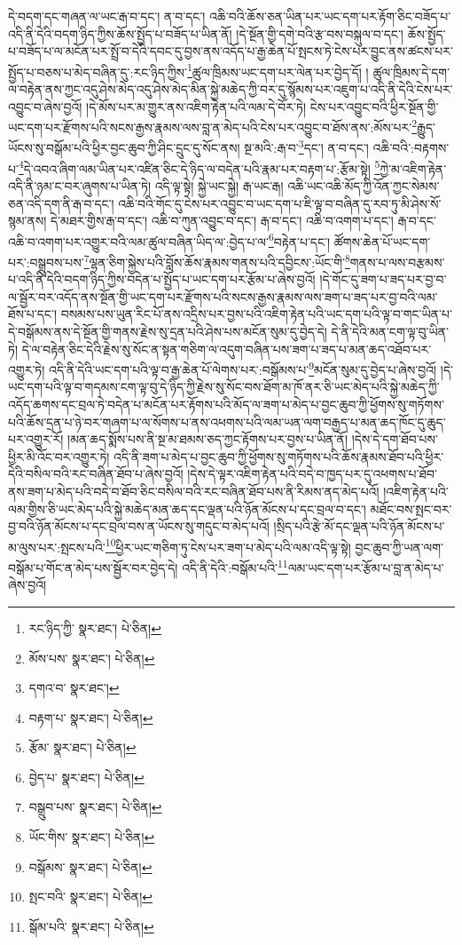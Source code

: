 དེ་བདག་དང་གཞན་ལ་ཡང་རྒ་བ་དང་། ན་བ་དང་། འཆི་བའི་ཆོས་ཅན་ཡིན་པར་ཡང་དག་པར་རྟོག་ཅིང་བཟོད་པ་འདི་ནི་དེའི་བདག་ཉིད་ཀྱིས་ཆོས་སྤྱོད་པ་བཟོད་པ་ཡིན་ནོ། །དེ་སྔོན་གྱི་དགེ་བའི་རྩ་བས་བསྐུལ་བ་དང་། ཆོས་སྤྱོད་པ་བཟོད་པ་ལ་མངོན་པར་སྤྲོ་བ་དེའི་དབང་དུ་བྱས་ནས་འདོད་པ་རྒྱ་ཆེན་པོ་སྤངས་ཏེ་ངེས་པར་བྱུང་ནས་ཚངས་པར་སྤྱོད་པ་བཅས་པ་མེད་བཞིན་དུ་:རང་ཉིད་ཀྱིས་\footnote{རང་ཉིད་ཀྱི་  སྣར་ཐང་།  པེ་ཅིན། }ཚུལ་ཁྲིམས་ཡང་དག་པར་ལེན་པར་བྱེད་དོ། །
ཚུལ་ཁྲིམས་དེ་དག་ལ་བརྟེན་ནས་ཀྱང་འདུ་ཤེས་མེད་འདུ་ཤེས་མེད་མིན་སྐྱེ་མཆེད་ཀྱི་བར་དུ་སྙོམས་པར་འཇུག་པ་འདི་ནི་དེའི་ངེས་པར་འབྱུང་བ་ཞེས་བྱའོ། །དེ་མོས་པར་མ་གྱུར་ནས་འཇིག་རྟེན་པའི་ལམ་དེ་བོར་ཏེ། ངེས་པར་འབྱུང་བའི་ཕྱིར་སྔོན་གྱི་ཡང་དག་པར་རྫོགས་པའི་སངས་རྒྱས་རྣམས་ལས་བླ་ན་མེད་པའི་ངེས་པར་འབྱུང་བ་ཐོས་ནས་:མོས་པར་\footnote{མོས་པས་  སྣར་ཐང་།  པེ་ཅིན། }རྒྱུད་ཡོངས་སུ་བསྒོམ་པའི་ཕྱིར་བྱང་ཆུབ་ཀྱི་ཤིང་དྲུང་དུ་སོང་ནས། སྔ་མའི་:རྒ་བ་\footnote{དགའ་བ་  སྣར་ཐང་། }དང་། ན་བ་དང་། འཆི་བའི་:བརྟགས་པ་\footnote{བརྟག་པ་  སྣར་ཐང་།  པེ་ཅིན། }དེ་འབའ་ཞིག་ལམ་ཡིན་པར་འཛིན་ཅིང་དེ་ཉིད་ལ་བདེན་པའི་རྣམ་པར་བརྟག་པ་:རྩོམ་སྟེ། \footnote{རྩོམ་  སྣར་ཐང་།  པེ་ཅིན། }ཀྱེ་མ་འཇིག་རྟེན་འདི་ནི་ཉམ་ང་བར་ཞུགས་པ་ཡིན་ཏེ། འདི་ལྟ་སྟེ། སྐྱེ་ཡང་སྐྱེ། རྒ་ཡང་རྒ། འཆི་ཡང་འཆི་མོད་ཀྱི་འོན་ཀྱང་སེམས་ཅན་འདི་དག་ནི་རྒ་བ་དང་། འཆི་བའི་གོང་དུ་ངེས་པར་འབྱུང་བ་ཡང་དག་པ་ཇི་ལྟ་བ་བཞིན་དུ་རབ་ཏུ་མི་ཤེས་སོ་སྙམ་ནས། དེ་མཐར་གྱིས་རྒ་བ་དང་། འཆི་བ་ཀུན་འབྱུང་བ་དང་། རྒ་བ་དང་། འཆི་བ་འགག་པ་དང་། རྒ་བ་དང་འཆི་བ་འགག་པར་འགྱུར་བའི་ལམ་ཚུལ་བཞིན་ཡིད་ལ་:བྱེད་པ་ལ་\footnote{བྱེད་པ་  སྣར་ཐང་།  པེ་ཅིན། }བརྟེན་པ་དང་། ཚོགས་ཆེན་པོ་ཡང་དག་པར་:བསྒྲུབས་པས་\footnote{བསྒྲུབ་པས་  སྣར་ཐང་།  པེ་ཅིན། }ལྷན་ཅིག་སྐྱེས་པའི་བློས་ཆོས་རྣམས་གནས་པའི་དབྱིངས་:ཡོང་གི་\footnote{ཡོང་གིས་  སྣར་ཐང་།  པེ་ཅིན། }གནས་པ་ལས་བརྩམས་པ་འདི་ནི་དེའི་བདག་ཉིད་ཀྱིས་བདེན་པ་སྤྱོད་པ་ཡང་དག་པར་རྩོམ་པ་ཞེས་བྱའོ། །དེ་གོང་དུ་ཟག་པ་ཟད་པར་བྱ་བ་ལ་སྦྱོར་བར་འདོད་ནས་སྔོན་གྱི་ཡང་དག་པར་རྫོགས་པའི་སངས་རྒྱས་རྣམས་ལས་ཟག་པ་ཟད་པར་བྱ་བའི་ལམ་ཐོས་པ་དང་། བསམས་པས་ཡུན་རིང་པོ་ནས་འདྲིས་པར་བྱས་པའི་འཇིག་རྟེན་པའི་ཡང་དག་པའི་ལྟ་བ་གང་ཡིན་པ་དེ་བསྒོམས་ནས་དེ་སྔོན་གྱི་གནས་རྗེས་སུ་དྲན་པའི་ཤེས་པས་མངོན་སུམ་དུ་བྱེད་དེ། དེ་ནི་དེའི་མན་ངག་ལྟ་བུ་ཡིན་ཏེ། དེ་ལ་བརྟེན་ཅིང་དེའི་རྗེས་སུ་སོང་ན་སྟན་གཅིག་ལ་འདུག་བཞིན་པས་ཟག་པ་ཟད་པ་མན་ཆད་འཐོབ་པར་འགྱུར་ཏེ། འདི་ནི་དེའི་ཡང་དག་པའི་ལྟ་བ་རྒྱ་ཆེན་པོ་ལེགས་པར་:བསྒོམས་པ་\footnote{བསྒོམས་  སྣར་ཐང་།  པེ་ཅིན། }མངོན་སུམ་དུ་བྱེད་པ་ཞེས་བྱའོ། །དེ་ཡང་དག་པའི་ལྟ་བ་གདམས་ངག་ལྟ་བུ་དེ་ཉིད་ཀྱི་རྗེས་སུ་སོང་བས་ཐོག་མ་ཁོ་ནར་ཅི་ཡང་མེད་པའི་སྐྱེ་མཆེད་ཀྱི་འདོད་ཆགས་དང་བྲལ་ཏེ་བདེན་པ་མངོན་པར་རྟོགས་པའི་མོད་ལ་ཟག་པ་མེད་པ་བྱང་ཆུབ་ཀྱི་ཕྱོགས་སུ་གཏོགས་པའི་ཆོས་དྲན་པ་ཉེ་བར་གཞག་པ་ལ་སོགས་པ་ནས་འཕགས་པའི་ལམ་ཡན་ལག་བརྒྱད་པ་མན་ཆད་ཁོང་དུ་ཆུད་པར་འགྱུར་རོ། །མན་ཆད་སྨོས་པས་ནི་སྔ་མ་ཐམས་ཅད་ཀྱང་རྟོགས་པར་བྱས་པ་ཡིན་ནོ། །དེས་དེ་དག་ཐོབ་པས་ཕྱིར་མི་འོང་བར་འགྱུར་ཏེ། འདི་ནི་ཟག་པ་མེད་པ་བྱང་ཆུབ་ཀྱི་ཕྱོགས་སུ་གཏོགས་པའི་ཆོས་རྣམས་ཐོབ་པའི་ཕྱིར་དེའི་བསིལ་བའི་རང་བཞིན་ཐོབ་པ་ཞེས་བྱའོ། །དེས་དེ་ལྟར་འཇིག་རྟེན་པའི་བདེ་བ་ཁྱད་པར་དུ་འཕགས་པ་ཐོབ་ནས་ཟག་པ་མེད་པའི་བདེ་བ་ཐོབ་ཅིང་བསིལ་བའི་རང་བཞིན་ཐོབ་པས་ནི་རིམས་ནད་མེད་པའོ། །འཇིག་རྟེན་པའི་ལམ་གྱིས་ཅི་ཡང་མེད་པའི་སྐྱེ་མཆེད་མན་ཆད་དང་ལྡན་པའི་ཉོན་མོངས་པ་དང་བྲལ་བ་དང་། མཐོང་བས་སྤང་བར་བྱ་བའི་ཉོན་མོངས་པ་དང་བྲལ་བས་ན་ཡོངས་སུ་གདུང་བ་མེད་པའོ། །སྲིད་པའི་རྩེ་མོ་དང་ལྡན་པའི་ཉོན་མོངས་པ་མ་ལུས་པར་:སྤངས་པའི་\footnote{སྤང་བའི་  སྣར་ཐང་།  པེ་ཅིན། }ཕྱིར་ཡང་གཅིག་ཏུ་ངེས་པར་ཟག་པ་མེད་པའི་ལམ་འདི་ལྟ་སྟེ། བྱང་ཆུབ་ཀྱི་ཡན་ལག་བསྒོམ་པ་གོང་ན་མེད་པས་སྦྱོར་བར་བྱེད་དེ། འདི་ནི་དེའི་:བསྒོམ་པའི་\footnote{སྒོམ་པའི་  སྣར་ཐང་།  པེ་ཅིན། }ལམ་ཡང་དག་པར་རྩོམ་པ་བླ་ན་མེད་པ་ཞེས་བྱའོ། 